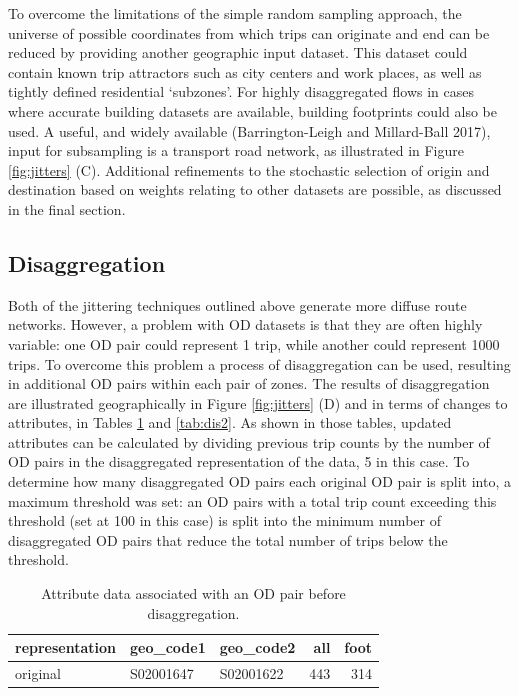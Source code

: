 \documentclass[
]{article}
\begin{document}
To overcome the limitations of the simple random sampling approach, the universe of possible coordinates from which trips can originate and end can be reduced by providing another geographic input dataset.
This dataset could contain known trip attractors such as city centers and work places, as well as tightly defined residential `subzones'.
For highly disaggregated flows in cases where accurate building datasets are available, building footprints could also be used.
A useful, and widely available (Barrington-Leigh and Millard-Ball 2017), input for subsampling is a transport road network, as illustrated in Figure \ref{fig:jitters} (C).
Additional refinements to the stochastic selection of origin and destination based on weights relating to other datasets are possible, as discussed in the final section.

\hypertarget{disaggregation}{%
\subsection{Disaggregation}\label{disaggregation}}

Both of the jittering techniques outlined above generate more diffuse route networks.
However, a problem with OD datasets is that they are often highly variable: one OD pair could represent 1 trip, while another could represent 1000 trips.
To overcome this problem a process of disaggregation can be used, resulting in additional OD pairs within each pair of zones.
The results of disaggregation are illustrated geographically in Figure \ref{fig:jitters} (D) and in terms of changes to attributes, in Tables \ref{tab:dis1} and \ref{tab:dis2}.
As shown in those tables, updated attributes can be calculated by dividing previous trip counts by the number of OD pairs in the disaggregated representation of the data, 5 in this case.
To determine how many disaggregated OD pairs each original OD pair is split into, a maximum threshold was set: an OD pairs with a total trip count exceeding this threshold (set at 100 in this case) is split into the minimum number of disaggregated OD pairs that reduce the total number of trips below the threshold.

\begin{table}

\caption{\label{tab:dis1}Attribute data associated with an OD pair before disaggregation.}
\centering
\begin{tabular}[t]{lllrr}
\toprule
representation & geo\_code1 & geo\_code2 & all & foot\\
\midrule
original & S02001647 & S02001622 & 443 & 314\\
\bottomrule
\end{tabular}
\end{table}
\end{document}
